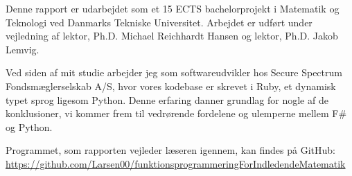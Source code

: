 Denne rapport er udarbejdet som et 15 ECTS bachelorprojekt i Matematik og Teknologi ved Danmarks Tekniske Universitet. Arbejdet er udført under vejledning af lektor, Ph.D. Michael Reichhardt Hansen og lektor, Ph.D. Jakob Lemvig.

Ved siden af mit studie arbejder jeg som softwareudvikler hos Secure Spectrum Fondsmæglerselskab A/S, hvor vores kodebase er skrevet i Ruby, et dynamisk typet sprog ligesom Python. Denne erfaring danner grundlag for nogle af de konklusioner, vi kommer frem til vedrørende fordelene og ulemperne mellem F\# og Python.

Programmet, som rapporten vejleder læseren igennem, kan findes på GitHub: \url{https://github.com/Larsen00/funktionsprogrammeringForIndledendeMatematik}